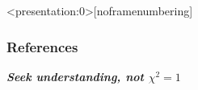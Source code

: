{}%
{}%
{}%
{}\begin{frame}<presentation:0>[noframenumbering]\markdownRendererInterblockSeparator
{}{\cite{Fukugita-1998} \cite{Shull} \cite{cen-ostriker-1999} \cite{tepper-2013} \cite{savage-2014} \cite{danforth-2016} \cite{acharya_khaire}}\markdownRendererInterblockSeparator
{}\end{frame}\markdownRendererInterblockSeparator
{}%
{}\begin{frame} \renewcommand{\bibfont}{\footnotesize} \frametitle{\huge{\textbf{References}}}\markdownRendererInterblockSeparator
{} \markdownRendererInterblockSeparator
{}\end{frame}\markdownRendererInterblockSeparator
{}\begin{frame}{} \centering \Huge \textbf{\emph{Seek understanding, not $\chi^2=1$}} \end{frame}\relax